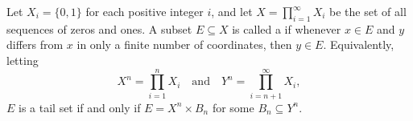 Let $X_i = \{0,1\}$ for each positive integer $i$, and let $X = \prod_{i=1}^{\infty} X_i$ be the set of all sequences of zeros and ones. A subset $E \subseteq X$ is called a  if whenever $x \in E$ and $y$ differs from $x$ in only a finite number of coordinates, then $y \in E$. Equivalently, letting
$$X^n = \prod_{i=1}^{n} X_i \quad \text{and} \quad Y^n = \prod_{i=n+1}^{\infty} X_i,$$
$E$ is a tail set if and only if $E = X^n \times B_n$ for some $B_n \subseteq Y^n$.
